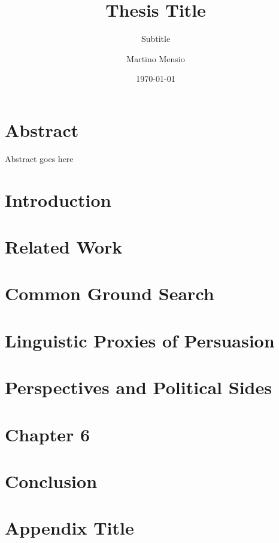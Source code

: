 \documentclass[12pt]{scrreprt}
\title{Thesis Title}
\subtitle{Subtitle}
\author{Martino Mensio}
\date{\today}
\begin{document}


\chapter*{Abstract}
Abstract goes here




\tableofcontents
\listoffigures
\listoftables

\chapter{Introduction}


\chapter{Related Work}


\chapter{Common Ground Search}


\chapter{Linguistic Proxies of Persuasion}


\chapter{Perspectives and Political Sides}


\chapter{Chapter 6}


\chapter{Conclusion}



\printbibliography[heading=bibintoc]
% 

\printglossary[type=\acronymtype]
\printglossary

\appendix
\chapter{Appendix Title}

\end{document}
